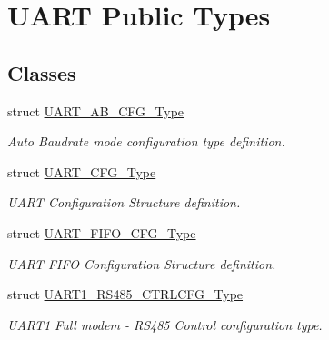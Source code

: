 \hypertarget{group___u_a_r_t___public___types}{\section{\-U\-A\-R\-T \-Public \-Types}
\label{group___u_a_r_t___public___types}
}
\subsection*{\-Classes}
\begin{DoxyCompactItemize}
\item 
struct \hyperlink{struct_u_a_r_t___a_b___c_f_g___type}{\-U\-A\-R\-T\-\_\-\-A\-B\-\_\-\-C\-F\-G\-\_\-\-Type}
\begin{DoxyCompactList}\small\item\em \-Auto \-Baudrate mode configuration type definition. \end{DoxyCompactList}\item 
struct \hyperlink{struct_u_a_r_t___c_f_g___type}{\-U\-A\-R\-T\-\_\-\-C\-F\-G\-\_\-\-Type}
\begin{DoxyCompactList}\small\item\em \-U\-A\-R\-T \-Configuration \-Structure definition. \end{DoxyCompactList}\item 
struct \hyperlink{struct_u_a_r_t___f_i_f_o___c_f_g___type}{\-U\-A\-R\-T\-\_\-\-F\-I\-F\-O\-\_\-\-C\-F\-G\-\_\-\-Type}
\begin{DoxyCompactList}\small\item\em \-U\-A\-R\-T \-F\-I\-F\-O \-Configuration \-Structure definition. \end{DoxyCompactList}\item 
struct \hyperlink{struct_u_a_r_t1___r_s485___c_t_r_l_c_f_g___type}{\-U\-A\-R\-T1\-\_\-\-R\-S485\-\_\-\-C\-T\-R\-L\-C\-F\-G\-\_\-\-Type}
\begin{DoxyCompactList}\small\item\em \-U\-A\-R\-T1 \-Full modem -\/ \-R\-S485 \-Control configuration type. \end{DoxyCompactList}\end{DoxyCompactItemize}
